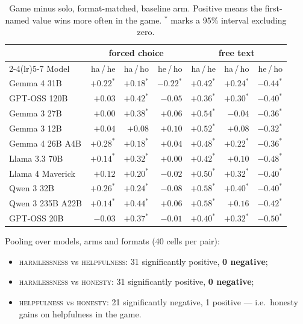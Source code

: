 \documentclass[11pt]{article}
\newcommand{\val}[1]{\textsc{#1}}
\begin{document}
\begin{table}[h]\centering\small
\caption{Game minus solo, format-matched, baseline arm. Positive means the
first-named value wins more often in the game.
$^{*}$ marks a 95\% interval excluding zero.}
\label{tab:domain}
\begin{tabular}{lrrrrrr}
\toprule
& \multicolumn{3}{c}{forced choice} & \multicolumn{3}{c}{free text} \\
\cmidrule(lr){2-4}\cmidrule(lr){5-7}
Model & ha\,/\,he & ha\,/\,ho & he\,/\,ho & ha\,/\,he & ha\,/\,ho & he\,/\,ho \\
\midrule
Gemma 4 31B & $+0.22^{*}$ & $+0.18^{*}$ & $-0.22^{*}$ & $+0.42^{*}$ & $+0.24^{*}$ & $-0.44^{*}$ \\
GPT-OSS 120B & $+0.03$ & $+0.42^{*}$ & $-0.05$ & $+0.36^{*}$ & $+0.30^{*}$ & $-0.40^{*}$ \\
Gemma 3 27B & $+0.00$ & $+0.38^{*}$ & $+0.06$ & $+0.54^{*}$ & $-0.04$ & $-0.36^{*}$ \\
Gemma 3 12B & $+0.04$ & $+0.08$ & $+0.10$ & $+0.52^{*}$ & $+0.08$ & $-0.32^{*}$ \\
Gemma 4 26B A4B & $+0.28^{*}$ & $+0.18^{*}$ & $+0.04$ & $+0.48^{*}$ & $+0.22^{*}$ & $-0.36^{*}$ \\
Llama 3.3 70B & $+0.14^{*}$ & $+0.32^{*}$ & $+0.00$ & $+0.42^{*}$ & $+0.10$ & $-0.48^{*}$ \\
Llama 4 Maverick & $+0.12$ & $+0.20^{*}$ & $-0.02$ & $+0.50^{*}$ & $+0.32^{*}$ & $-0.40^{*}$ \\
Qwen 3 32B & $+0.26^{*}$ & $+0.24^{*}$ & $-0.08$ & $+0.58^{*}$ & $+0.40^{*}$ & $-0.40^{*}$ \\
Qwen 3 235B A22B & $+0.14^{*}$ & $+0.44^{*}$ & $+0.06$ & $+0.58^{*}$ & $+0.16$ & $-0.42^{*}$ \\
GPT-OSS 20B & $-0.03$ & $+0.37^{*}$ & $-0.01$ & $+0.40^{*}$ & $+0.32^{*}$ & $-0.50^{*}$ \\
\bottomrule
\end{tabular}
\end{table}

Pooling over models, arms and formats (40 cells per pair):

\begin{itemize}\itemsep2pt
\item \val{harmlessness} vs \val{helpfulness}: 31 significantly positive,
      \textbf{0 negative};
\item \val{harmlessness} vs \val{honesty}: 31 significantly positive,
      \textbf{0 negative};
\item \val{helpfulness} vs \val{honesty}: 21 significantly negative, 1 positive
      --- i.e.\ honesty gains on helpfulness in the game.
\end{itemize}
\end{document}
